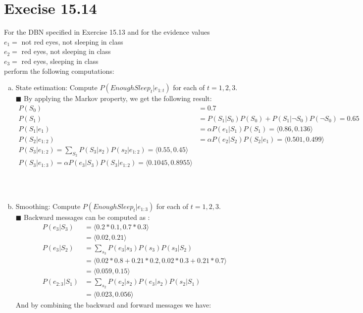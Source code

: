 \documentclass{article}
\newcommand{\solution}[1]{~\\ $\blacksquare$ \sffamily\upshape\selectfont #1
\normalfont ~\\~ }
\begin{document}
\section{Execise 15.14}
For the DBN specified in Exercise 15.13 and for the evidence values \\
$e_1 =$ not red eyes, not sleeping in class \\
$e_2 =$ red eyes, not sleeping in class \\
$e_3 =$ red eyes, sleeping in class \\
perform the following computations:
\begin{enumerate}[a.]
\item State estimation: Compute $P(EnoughSleep_t|e_{1:t})$ for each
  of $t = 1, 2, 3$.
\solution{
  By applying the Markov property, we get the following result: 
  \begin{align*}
    P(S_0) & = 0.7 \\ 
    P(S_1) & = P(S_1|S_0)P(S_0) + P(S_1|\neg S_0)P(\neg S_0) = 0.65 \\
    P(S_1|e_1) & = \alpha P(e_1|S_1)P(S_1)  = \langle 0.86, 0.136
    \rangle \\
    P(S_2|e_{1:2}) &= \alpha P(e_2|S_2)P(S_2|e_1) = \langle 0.501,
    0.499 \rangle \\ 
    P(S_3|e_{1:2}) = \sum_{S_2}P(S_3|s_2)P(s_2|e_{1:2}) = \langle
    0.55, 0.45 \rangle \\ 
    P(S_3|e_{1:3}) = \alpha P(e_3|S_3)P(S_3|e_{1:2}) = \langle
    0.1045, 0.8955 \rangle 
  \end{align*}
}
\item Smoothing: Compute $P(EnoughSleep_t|e_{1:3})$ for each of $t =
  1,2,3$.
\solution{
  Backward messages can be computed as : \\
  \begin{align*}
    P(e_3|S_3) &= \langle 0.2*0.1, 0.7*0.3 \rangle \\ 
    & = \langle 0.02, 0.21\rangle \\ 
    P(e_3|S_2) &= \sum_{s_3}P(e_3|s_3)P(s_3)P(s_3|S_2) \\
    & = \langle 0.02*0.8+0.21*0.2, 0.02*0.3+0.21*0.7 \rangle \\ 
    & = \langle 0.059, 0.15 \rangle \\
    P(e_{2:3}|S_1) &= \sum_{s_2}P(e_2|s_2)P(e_3|s_2)P(s_2|S_1) \\ 
    & = \langle 0.023 , 0.056 \rangle 
  \end{align*}
  And by combining the backward and forward messages we have: 
  \begin{align*}

\end{align*}}
\end{enumerate}
\end{document}
